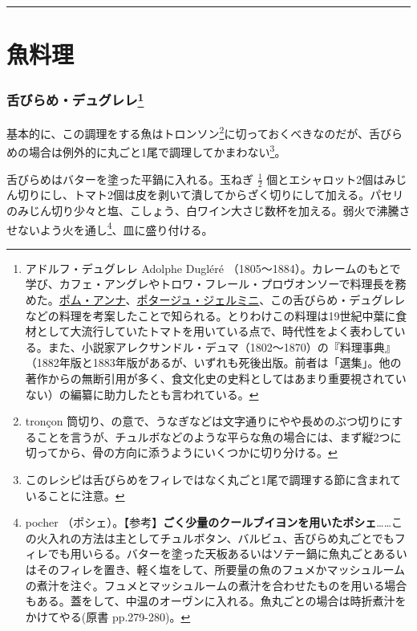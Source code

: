 \begin{center}\rule{0.5\linewidth}{\linethickness}\end{center}

\hypertarget{les-poissons}{%
\section{魚料理}\label{les-poissons}}
\begin{recette}
\hypertarget{sole-duglere}{%
\subsubsection[舌びらめ・デュグレレ]{\texorpdfstring{舌びらめ・デュグレレ\footnote{アドルフ・デュグレレ
  Adolphe Dugléré
  （1805〜1884）。カレームのもとで学び、カフェ・アングレやトロワ・フレール・プロヴオンソーで料理長を務めた。\protect\hyperlink{pommes-de-terre-anna}{ポム・アンナ}、\protect\hyperlink{potage-germiny}{ポタージュ・ジェルミニ}、この舌びらめ・デュグレレなどの料理を考案したことで知られる。とりわけこの料理は19世紀中葉に食材として大流行していたトマトを用いている点で、時代性をよく表わしている。また、小説家アレクサンドル・デュマ（1802〜1870）の『料理事典』（1882年版と1883年版があるが、いずれも死後出版。前者は「選集」。他の著作からの無断引用が多く、食文化史の史料としてはあまり重要視されていない）の編纂に助力したとも言われている。}}{舌びらめ・デュグレレ}}\label{sole-duglere}}



基本的に、この調理をする魚はトロンソン\footnote{tronçon
  筒切り、の意で、うなぎなどは文字通りにやや長めのぶつ切りにすることを言うが、チュルボなどのような平らな魚の場合には、まず縦2つに切ってから、骨の方向に添うようにいくつかに切り分ける。}に切っておくべきなのだが、舌びらめの場合は例外的に丸ごと1尾で調理してかまわない\footnote{このレシピは舌びらめをフィレではなく丸ごと1尾で調理する節に含まれていることに注意。}。

舌びらめはバターを塗った平鍋に入れる。玉ねぎ \(\frac{1}{2}\)
個とエシャロット2個はみじん切りにし、トマト2個は皮を剥いて潰してからざく切りにして加える。パセリのみじん切り少々と塩、こしょう、白ワイン大さじ数杯を加える。弱火で沸騰させないよう火を通し\footnote{pocher
  （ポシェ）。【参考】\textbf{ごく少量のクールブイヨンを用いたポシェ}\ldots{}\ldots{}この火入れの方法は主としてチュルボタン、バルビュ、舌びらめ丸ごとでもフィレでも用いらる。バターを塗った天板あるいはソテー鍋に魚丸ごとあるいはそのフィレを置き、軽く塩をして、所要量の魚のフュメかマッシュルームの煮汁を注ぐ。フュメとマッシュルームの煮汁を合わせたものを用いる場合もある。蓋をして、中温のオーヴンに入れる。魚丸ごとの場合は時折煮汁をかけてやる(原書
  pp.279-280)。}、皿に盛り付ける。


\end{recette}
